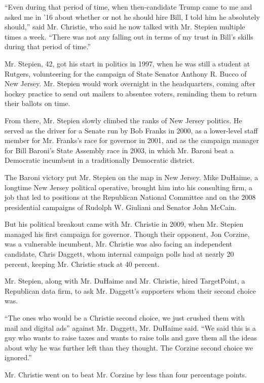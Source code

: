 ``Even during that period of time, when then-candidate Trump came to me
and asked me in '16 about whether or not he should hire Bill, I told him
he absolutely should,'' said Mr. Christie, who said he now talked with
Mr. Stepien multiple times a week. ``There was not any falling out in
terms of my trust in Bill's skills during that period of time.''

Mr. Stepien, 42, got his start in politics in 1997, when he was still a
student at Rutgers, volunteering for the campaign of State Senator
Anthony R. Bucco of New Jersey. Mr. Stepien would work overnight in the
headquarters, coming after hockey practice to send out mailers to
absentee voters, reminding them to return their ballots on time.

From there, Mr. Stepien slowly climbed the ranks of New Jersey politics.
He served as the driver for a Senate run by Bob Franks in 2000, as a
lower-level staff member for Mr. Franks's race for governor in 2001, and
as the campaign manager for Bill Baroni's State Assembly race in 2003,
in which Mr. Baroni beat a Democratic incumbent in a traditionally
Democratic district.

The Baroni victory put Mr. Stepien on the map in New Jersey. Mike
DuHaime, a longtime New Jersey political operative, brought him into his
consulting firm, a job that led to positions at the Republican National
Committee and on the 2008 presidential campaigns of Rudolph W. Giuliani
and Senator John McCain.

But his political breakout came with Mr. Christie in 2009, when Mr.
Stepien managed his first campaign for governor. Though their opponent,
Jon Corzine, was a vulnerable incumbent, Mr. Christie was also facing an
independent candidate, Chris Daggett, whom internal campaign polls had
at nearly 20 percent, keeping Mr. Christie stuck at 40 percent.

Mr. Stepien, along with Mr. DuHaime and Mr. Christie, hired TargetPoint,
a Republican data firm, to ask Mr. Daggett's supporters whom their
second choice was.

``The ones who would be a Christie second choice, we just crushed them
with mail and digital ads'' against Mr. Daggett, Mr. DuHaime said. ``We
said this is a guy who wants to raise taxes and wants to raise tolls and
gave them all the ideas about why he was further left than they thought.
The Corzine second choice we ignored.''

Mr. Christie went on to beat Mr. Corzine by less than four percentage
points.

